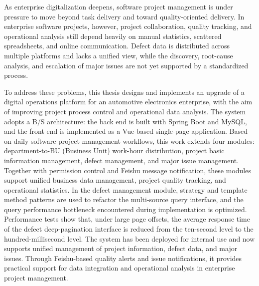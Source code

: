 As enterprise digitalization deepens, software project management is under pressure to move beyond task delivery and toward quality-oriented delivery. In enterprise software projects, however, project collaboration, quality tracking, and operational analysis still depend heavily on manual statistics, scattered spreadsheets, and online communication. Defect data is distributed across multiple platforms and lacks a unified view, while the discovery, root-cause analysis, and escalation of major issues are not yet supported by a standardized process.

To address these problems, this thesis designs and implements an upgrade of a digital operations platform for an automotive electronics enterprise, with the aim of improving project process control and operational data analysis. The system adopts a B/S architecture: the back end is built with Spring Boot and MySQL, and the front end is implemented as a Vue-based single-page application. Based on daily software project management workflows, this work extends four modules: department-to-BU (Business Unit) work-hour distribution, project basic information management, defect management, and major issue management. Together with permission control and Feishu message notification, these modules support unified business data management, project quality tracking, and operational statistics. In the defect management module, strategy and template method patterns are used to refactor the multi-source query interface, and the query performance bottleneck encountered during implementation is optimized. Performance tests show that, under large page offsets, the average response time of the defect deep-pagination interface is reduced from the ten-second level to the hundred-millisecond level. The system has been deployed for internal use and now supports unified management of project information, defect data, and major issues. Through Feishu-based quality alerts and issue notifications, it provides practical support for data integration and operational analysis in enterprise project management.
